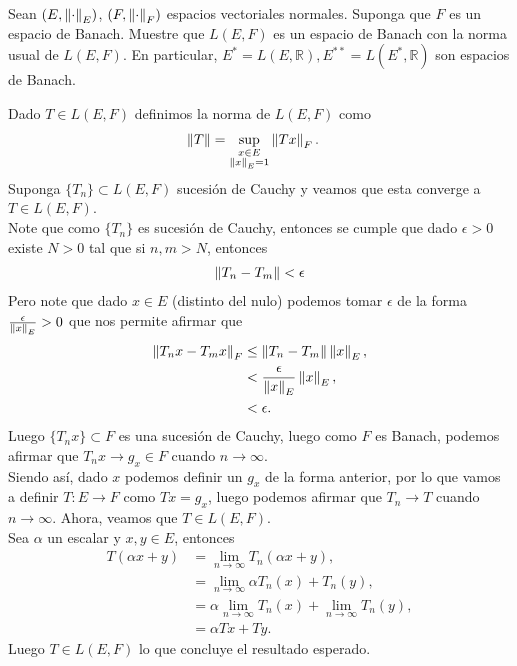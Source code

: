 \begin{homeworkProblem}
  Sean $(E,\left\|\cdot\right\|_{E})$, $(F,\left\|\cdot\right\|_{F})$ espacios vectoriales normales. Suponga que $F$ es un espacio de Banach. Muestre que $L(E,F)$ es un espacio de Banach con la norma usual de $L(E,F)$. En particular, $E^{*}=L(E,\mathbb{R}),E^{**}=L(E^{*},\mathbb{R})$ son espacios de Banach. 
  \begin{solution}
    Dado $T\in L(E,F)$ definimos la norma de $L(E,F)$ como
    \begin{align*}
      \left\|T\right\|&=\sup_{\substack{x\in E\\\left\|x\right\|_{E}=1}}\left\|Tx\right\|_{F}.
    \end{align*}
    Suponga $\{T_n\}\subset L(E,F)$ sucesión de Cauchy y veamos que esta converge a $T\in L(E,F)$.\\
    Note que como $\{T_n\}$ es sucesión de Cauchy, entonces se cumple que dado $\epsilon>0$ existe $N>0$ tal que si $n,m>N$, entonces
    \begin{align*}
      \left\|T_n-T_m\right\|<\epsilon
    \end{align*}
    Pero note que dado $x\in E$ (distinto del nulo) podemos tomar $\epsilon$ de la forma $\frac{\epsilon}{\left\|x\right\|_{E}}>0$ que nos permite afirmar que 
    \begin{align*}
      \left\|T_nx-T_mx\right\|_{F}&\leq \left\|T_n-T_m\right\|\left\|x\right\|_{E},\\
      &<\frac{\epsilon}{\left\|x\right\|_{E}}\left\|x\right\|_{E},\\
      &<\epsilon.
    \end{align*}
    Luego $\{T_nx\}\subset F$ es una sucesión de Cauchy, luego como $F$ es Banach, podemos afirmar que $T_{n}x\to g_x\in F$ cuando $n\to \infty$.\\
    Siendo así, dado $x$ podemos definir un $g_x$ de la forma anterior, por lo que vamos a definir $T:E\to F$ como $Tx=g_x$, luego podemos afirmar que $T_n\to T$ cuando $n\to \infty$. Ahora, veamos que $T\in L(E,F)$.\\
    Sea $\alpha$ un escalar y $x,y\in E$, entonces 
    \begin{align*}
      T(\alpha x+y)&=\lim_{n \to \infty}T_{n}(\alpha x+y),\\
      &=\lim_{n \to \infty}\alpha T_{n}(x)+T_{n}(y),\\
      &=\alpha \lim_{n \to \infty}T_{n}(x)+\lim_{n \to \infty}T_{n}(y),\\
      &=\alpha Tx + Ty.
    \end{align*}
    Luego $T\in L(E,F)$ lo que concluye el resultado esperado. 
  \end{solution}
\end{homeworkProblem}
